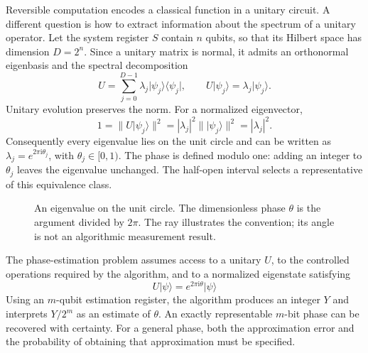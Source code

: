 \documentclass[11pt,oneside,openany]{book}
\providecommand{\ket}{}
\renewcommand{\ket}[1]{\lvert #1\rangle}
\newcommand{\ketbra}[2]{\lvert #1\rangle\langle #2\rvert}
\newcommand{\ii}{\mathrm{i}}
\theoremstyle{definition}
\begin{document}
Reversible computation encodes a classical function in a unitary circuit. A different question is how to extract information about the spectrum of a unitary operator. Let the system register $S$ contain $n$ qubits, so that its Hilbert space has dimension $D=2^n$. Since a unitary matrix is normal, it admits an orthonormal eigenbasis and the spectral decomposition
\begin{equation}
 U=\sum_{j=0}^{D-1}\lambda_j\ketbra{\psi_j}{\psi_j},
 \qquad U\ket{\psi_j}=\lambda_j\ket{\psi_j}.
 \label{eq:phase:spectral}
\end{equation}
Unitary evolution preserves the norm. For a normalized eigenvector,
\begin{equation}
 1=\|U\ket{\psi_j}\|^2=|\lambda_j|^2\|\ket{\psi_j}\|^2=|\lambda_j|^2.
\end{equation}
Consequently every eigenvalue lies on the unit circle and can be written as $\lambda_j=e^{2\pi\ii\theta_j}$, with $\theta_j\in[0,1)$. The phase is defined modulo one: adding an integer to $\theta_j$ leaves the eigenvalue unchanged. The half-open interval selects a representative of this equivalence class.
\par
\begin{figure}[htbp]
\centering
{}
\caption{An eigenvalue on the unit circle. The dimensionless phase $\theta$ is the argument divided by $2\pi$. The ray illustrates the convention; its angle is not an algorithmic measurement result.}
\label{fig:phase:unitcircle}
\end{figure}
\par

The phase-estimation problem assumes access to a unitary $U$, to the controlled operations required by the algorithm, and to a normalized eigenstate satisfying
\begin{equation}
 U\ket{\psi}=e^{2\pi\ii\theta}\ket{\psi}
 \label{eq:phase:eigenpromise}
\end{equation}
Using an $m$-qubit estimation register, the algorithm produces an integer $Y$ and interprets $Y/2^m$ as an estimate of $\theta$. An exactly representable $m$-bit phase can be recovered with certainty. For a general phase, both the approximation error and the probability of obtaining that approximation must be specified.
\end{document}
